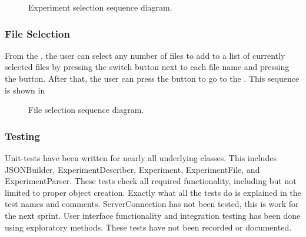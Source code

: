 \begin{figure}[ht]
\caption{Experiment selection sequence diagram.}
\label{fig:ios_sequence_experiment_selection}
\end{figure}

\subsubsection{File Selection}

From the , the user can select any number of files to add to a list of currently selected files by pressing the switch button next to each file name and pressing the  button. After that, the user can press the  button to go to the . This sequence is shown in 

\begin{figure}[ht]
\caption{File selection sequence diagram.}
\label{fig:ios_sequence_file_selection}
\end{figure}

\FloatBarrier

\subsubsection{Testing}

Unit-tests have been written for nearly all underlying classes. This includes JSONBuilder, ExperimentDescriber, Experiment, ExperimentFile, and ExperimentParser. These tests check all required functionality, including but not limited to proper object creation. Exactly what all the tests do is explained in the test names and comments. ServerConnection has not been tested, this is work for the next sprint. User interface functionality and integration testing has been done using exploratory methods. These tests have not been recorded or documented.
